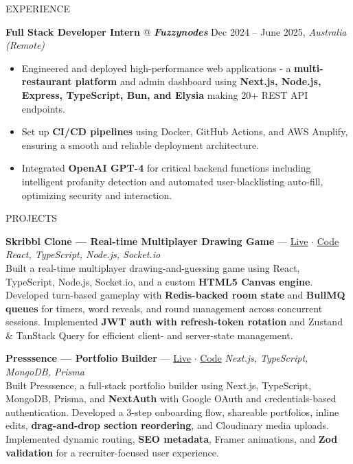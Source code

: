 \documentclass{resume} %
\makeatletter
\newcommand{\experience}[5]{
    \textbf{#1} @ \textit{\textbf{#2}} \hfill #3, \textit{#4}
    \vspace{-7pt}
    \begin{itemize}[leftmargin=*]
        \itemsep -7pt {}
        #5
    \end{itemize}
    \vspace{-4pt}
}
\newcommand{\project}[5]{
    \item \textbf{#1} --- \href{#2}{Live} $\cdot$ \href{#3}{Code} \hfill \textit{#4}\\
    #5
    \vspace{-5pt}
}
\makeatother
\begin{document}
\begin{rSection}{EXPERIENCE}
\experience{Full Stack Developer Intern}{Fuzzynodes}{Dec 2024 -- June 2025}{Australia (Remote)}{
    \item Engineered and deployed high-performance web applications - a \textbf{multi-restaurant platform} and admin dashboard  using \textbf{Next.js, Node.js, Express, TypeScript, Bun, and Elysia} making 20+ REST API endpoints. %
    \item Set up \textbf{CI/CD pipelines} using Docker, GitHub Actions, and AWS Amplify, ensuring a smooth and reliable deployment architecture.
    \item Integrated \textbf{OpenAI GPT-4} for critical backend functions including intelligent profanity detection and automated user-blacklisting auto-fill, optimizing security and interaction.
}

\end{rSection}

\vspace{-1pt}
\begin{rSection}{PROJECTS}
\vspace{-12pt}

\project{Skribbl Clone --- Real-time Multiplayer Drawing Game}{https://skribbl.iamprathamesh.xyz}{https://github.com/pr4th4meshh/skribbl}{React, TypeScript, Node.js, Socket.io}{
    Built a real-time multiplayer drawing-and-guessing game using React, TypeScript, Node.js, Socket.io, and a custom \textbf{HTML5 Canvas engine}. Developed turn-based gameplay with \textbf{Redis-backed room state} and \textbf{BullMQ queues} for timers, word reveals, and round management across concurrent sessions. Implemented \textbf{JWT auth with refresh-token rotation} and Zustand \& TanStack Query for efficient client- and server-state management.
}
\project{Presssence --- Portfolio Builder}{https://presssence.iamprathamesh.xyz}{https://github.com/pr4th4meshh/presssence}{Next.js, TypeScript, MongoDB, Prisma}{
    Built Presssence, a full-stack portfolio builder using Next.js, TypeScript, MongoDB, Prisma, and \textbf{NextAuth} with Google OAuth and credentials-based authentication. Developed a 3-step onboarding flow, shareable portfolios, inline edits, \textbf{drag-and-drop section reordering}, and Cloudinary media uploads. Implemented dynamic routing, \textbf{SEO metadata}, Framer animations, and \textbf{Zod validation} for a recruiter-focused user experience.
}

\end{rSection}
\end{document}
